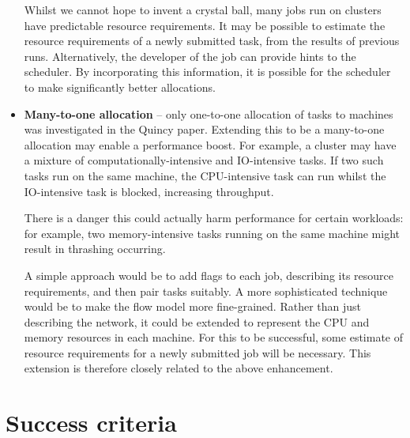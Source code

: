 \begin{itemize}
        Whilst we cannot hope to invent a crystal ball, many jobs run on clusters have predictable resource requirements. It may be possible to estimate the resource requirements of a newly submitted task, from the results of previous runs. Alternatively, the developer of the job can provide hints to the scheduler. By incorporating this information, it is possible for the scheduler to make significantly better allocations. 
  \item \textbf{Many-to-one allocation} -- only one-to-one allocation of tasks to machines was investigated in the Quincy paper. Extending this to be a many-to-one allocation may enable a performance boost. For example, a cluster may have a mixture of computationally-intensive and IO-intensive tasks. If two such tasks run on the same machine, the CPU-intensive task can run whilst the IO-intensive task is blocked, increasing throughput.

        There is a danger this could actually harm performance for certain workloads: for example, two memory-intensive tasks running on the same machine might result in thrashing occurring. 

        A simple approach would be to add flags to each job, describing its resource requirements, and then pair tasks suitably. A more sophisticated technique would be to make the flow model more fine-grained. Rather than just describing the network, it could be extended to represent the CPU and memory resources in each machine. For this to be successful, some estimate of resource requirements for a newly submitted job will be necessary. This extension is therefore closely related to the above enhancement.
\end{itemize}

\section*{Success criteria}

